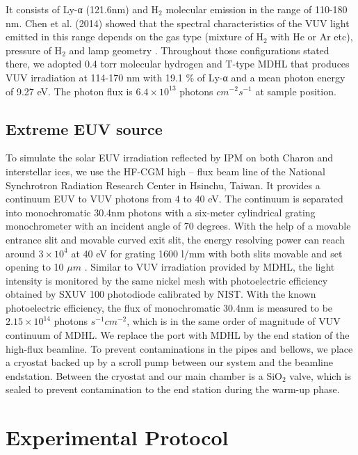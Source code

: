 It consists of Ly-α (121.6nm) and H$_2$ molecular emission in the range of 110-180 nm. Chen et al. (2014) showed that the spectral characteristics of the VUV light emitted in this range depends on the gas type (mixture of H$_2$ with He or Ar etc), pressure of H$_2$ and lamp geometry \cite{chen2013vacuum}. Throughout those configurations stated there, we adopted 0.4 torr molecular hydrogen and T-type MDHL that produces VUV irradiation at 114-170 nm with 19.1 \% of Ly-α and a mean photon energy of 9.27 eV. The photon flux is $6.4 \times 10^{13}$ photons $cm^{-2} s^{-1}$ at sample position.

\subsection{Extreme EUV source}
\label{sec:Extreme_EUV_source}

To simulate the solar EUV irradiation reflected by IPM on both Charon and interstellar ices, we use the HF-CGM high – flux beam line of the National Synchrotron Radiation Research Center in Hsinchu, Taiwan. It provides a continuum EUV to VUV photons from 4 to 40 eV. The continuum is separated into monochromatic 30.4nm photons with a six-meter cylindrical grating monochrometer with an incident angle of 70 degrees. With the help of a movable entrance slit and movable curved exit slit, the energy resolving power can reach around $3 \times 10^4$ at 40 eV for grating 1600 l/mm with both slits movable and set opening to 10 $\mu m$ \cite{hsieh1998design}. Similar to VUV irradiation provided by MDHL, the light intensity is monitored by the same nickel mesh with photoelectric efficiency obtained by SXUV 100 photodiode calibrated by NIST. With the known photoelectric efficiency, the flux of monochromatic 30.4nm is measured to be $2.15 \times 10^{14}$ photons $s^{-1} cm^{-2}$, which is in the same order of magnitude of VUV continuum of MDHL. We replace the port with MDHL by the end station of the high-flux beamline. To prevent contaminations in the pipes and bellows, we place a cryostat backed up by a scroll pump between our system and the beamline endstation. Between the cryostat and our main chamber is a SiO$_2$ valve, which is sealed to prevent contamination to the end station during the warm-up phase.

\section{Experimental Protocol}
\label{sec:Experimental_Protocol}

